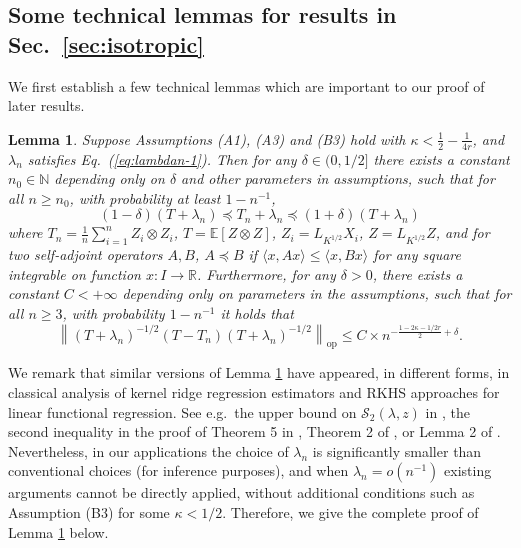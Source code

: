 \documentclass[11pt,a4paper]{article}
\theoremstyle{definition}
\theoremstyle{plain}
\newtheorem{lemma}{Lemma}[section]
\theoremstyle{remark}
\newcommand{\op}{\mathrm{op}}
\begin{document}
\subsection{Some technical lemmas for results in Sec.~\ref{sec:isotropic}}

We first establish a few technical lemmas which are important to our proof of later results.
\begin{lemma}
Suppose Assumptions (A1), (A3) and (B3) hold with $\kappa<\frac{1}{2}-\frac{1}{4r}$, and $\lambda_n$ satisfies Eq.~(\ref{eq:lambdan-1}). Then for any $\delta\in(0,1/2]$ there exists a constant $n_0\in\mathbb N$ depending only on $\delta$ and other parameters in assumptions,
 such that for all $n\geq n_0$, with probability at least $1-n^{-1}$,
$$
(1-\delta)(T+\lambda_n)\preceq T_n+\lambda_n \preceq (1+\delta)(T+\lambda_n)
$$
where $T_n=\frac{1}{n}\sum_{i=1}^n Z_i\otimes Z_i$, $T=\mathbb E[Z\otimes Z]$, $Z_i=L_{K^{1/2}}X_i$, $Z=L_{K^{1/2}}Z$, and for two self-adjoint operators $A,B$, $A\preceq B$ if $\langle x,Ax\rangle\leq \langle x, Bx\rangle$
for any square integrable on function $x:I\to\mathbb R$.
Furthermore, for any $\delta>0$, there exists a constant $C<+\infty$ depending only on parameters in the assumptions, such that for all $n\geq 3$, with probability $1-n^{-1}$ it holds that
$$
\left\|(T+\lambda_n)^{-1/2}(T-T_n)(T+\lambda_n)^{-1/2}\right\|_\op \leq C\times n^{-\frac{1-2\kappa-1/2r}{2}+\delta}.
$$
\label{lem:empirical-population-cov}
\end{lemma}

We remark that similar versions of Lemma \ref{lem:empirical-population-cov} have appeared, in different forms, in classical analysis of kernel ridge regression estimators and RKHS approaches for linear functional regression.
See e.g.~the upper bound on $\mathcal S_2(\lambda,z)$ in \citep{caponnetto2007optimal}, the second inequality in the proof of Theorem 5 in \citep{smale2007learning}, 
Theorem 2 of \citep{hsu2014random},
or Lemma 2 of \citep{cai2012minimax}.
Nevertheless, in our applications the choice of $\lambda_n$ is significantly smaller than conventional choices (for inference purposes), and when $\lambda_n = o(n^{-1})$ existing arguments cannot be directly applied,
without additional conditions such as Assumption (B3) for some $\kappa<1/2$. Therefore, we give the complete proof of Lemma \ref{lem:empirical-population-cov} below.
\end{document}
